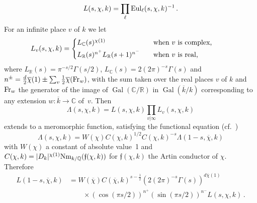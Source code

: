 \documentclass{amsart}
\begin{document}
\[
 {L(s,{\chi},k)}= \prod_\ell {\textup{Eul}}_\ell(s,\chi,k)^{-1} 
\,.
\]
For an infinite place $ v $ of $ k $ we let
\begin{equation*}
L_v(s, \chi, k) = \left\{
\begin{aligned}
& \hbox to 1.5 in {$ L_{\mathbb C}(s)^{\chi(1)} $\hfill}\hbox to 1.5 in{when $ v $ is complex,\hfill}
\\
& \hbox to 1.5 in {$ L_{\mathbb R}(s)^{n^+} L_{\mathbb R}(s+1)^{n^-} $\hfill}\hbox to 1.5 in{when $ v $ is real,\hfill}
\end{aligned}
\right.
\end{equation*}
where $ L_{\mathbb R}(s) = \pi^{-s/2} \Gamma(s/2) $, $ L_{\mathbb C}(s) = 2 (2\pi)^{-s}  \Gamma(s) $
and
$ n^\pm = \frac d2 \overline\chi(1) \pm \sum_v  \frac 12 \overline\chi({\textup{Fr}}_w) $,
with the sum taken over the real places $ v $ of $ k $
and $ {\textup{Fr}}_w $ the generator of the image of $ {\operatorname{Gal}}({\mathbb C}/{\mathbb R}) $ in $ {\operatorname{Gal}}({\overline{k}}/k) $
corresponding to any extension $ w : {\overline{k}} \to {\mathbb C} $ of~$ v $.
Then 
\begin{equation*}
\Lambda(s, \chi, k) =  {L(s,{\chi},k)}\prod_{v|\infty} L_v(s, \chi, k)  
\end{equation*}
extends to a meromorphic function, satisfying the functional equation
(cf.\ \cite[p.\ 541]{Neu99})
\begin{equation*}
\Lambda(s, \chi, k) = W(\chi) C(\chi,k)^{1/2}  C(\chi,k)^{-s} \Lambda(1-s, \overline\chi, k) 
\end{equation*}
with $ W(\chi) $ a constant of absolute value~1
and $ C(\chi,k) = |D_k|^{\chi(1)} {\textup{Nm}}_{k/{\mathbb Q}}({\mathfrak f}(\chi,k)) $ for $ {\mathfrak f}(\chi,k) $ the Artin conductor of $ \chi $.
Therefore
\begin{equation}\label{oldfuneq}
\begin{aligned}
{L(1-s,{\overline\chi},k)}
& =
W(\overline\chi) C(\overline\chi,k)^{s-\frac12} (2 (2\pi)^{-s}\Gamma(s))^{d\overline\chi(1)}
\\
& \qquad\times
 (\cos(\pi s/2))^{n^+}  (\sin(\pi s/2))^{n^-} {L(s,{\chi},k)}
\,.
\end{aligned}
\end{equation}
\end{document}
